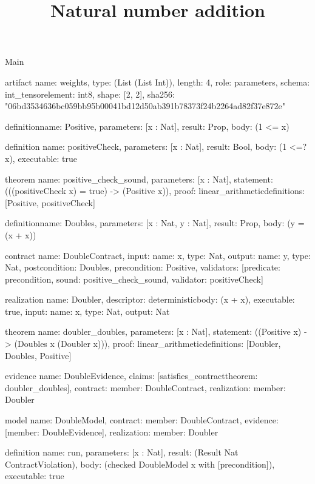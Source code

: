 \begin{lexlean}{Main}
\title{Natural number addition}
\begin{semanticmodule}
artifact{
  name: weights,
  type: (List (List Int)),
  length: 4,
  role: parameters,
  schema: int_tensor{element: int8, shape: [2, 2]},
  sha256: "06bd3534636bc059bb95b00041bd12d50ab391b78373f24b2264ad82f37e872e"
}

definition{name: Positive, parameters: [x : Nat], result: Prop, body: (1 <= x)}

definition{
  name: positiveCheck,
  parameters: [x : Nat],
  result: Bool,
  body: (1 <=? x),
  executable: true
}

theorem{
  name: positive_check_sound,
  parameters: [x : Nat],
  statement: (((positiveCheck x) = true) -> (Positive x)),
  proof: linear_arithmetic{definitions: [Positive, positiveCheck]}
}

definition{name: Doubles, parameters: [x : Nat, y : Nat], result: Prop, body: (y = (x + x))}

contract{
  name: DoubleContract,
  input: {name: x, type: Nat},
  output: {name: y, type: Nat},
  postcondition: Doubles,
  precondition: Positive,
  validators: [{predicate: precondition, sound: positive_check_sound, validator: positiveCheck}]
}

realization{
  name: Doubler,
  descriptor: deterministic{body: (x + x)},
  executable: true,
  input: {name: x, type: Nat},
  output: Nat
}

theorem{
  name: doubler_doubles,
  parameters: [x : Nat],
  statement: ((Positive x) -> (Doubles x (Doubler x))),
  proof: linear_arithmetic{definitions: [Doubler, Doubles, Positive]}
}

evidence{
  name: DoubleEvidence,
  claims: [satisfies_contract{theorem: doubler_doubles}],
  contract: {member: DoubleContract},
  realization: {member: Doubler}
}

model{
  name: DoubleModel,
  contract: {member: DoubleContract},
  evidence: [{member: DoubleEvidence}],
  realization: {member: Doubler}
}

definition{
  name: run,
  parameters: [x : Nat],
  result: (Result Nat ContractViolation),
  body: (checked DoubleModel x with [precondition]),
  executable: true
}
\end{semanticmodule}
\end{lexlean}

